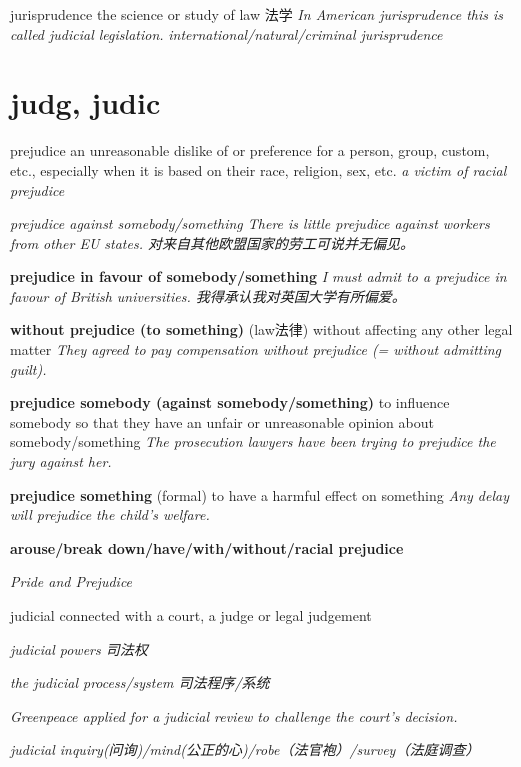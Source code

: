 \begin{DefWord}{jurisprudence}
    the science or study of law 法学
    \textit{In American jurisprudence this is called judicial legislation.}
    \textit{international/natural/criminal jurisprudence}
\end{DefWord}





\section{judg, judic}


\begin{DefWord}{prejudice}
    an unreasonable dislike of or preference for a person, group, custom, etc., especially when it is based on their race, religion, sex, etc.
    \textit{a victim of racial prejudice}

    \textit{prejudice against somebody/something There is little prejudice against workers from other EU states. 对来自其他欧盟国家的劳工可说并无偏见。}
    
    \textbf{prejudice in favour of somebody/something} \textit{I must admit to a prejudice in favour of British universities. 我得承认我对英国大学有所偏爱。}

    \textbf{without prejudice (to something)}
    (law法律) without affecting any other legal matter
    \textit{They agreed to pay compensation without prejudice (= without admitting guilt).}

    \textbf{prejudice somebody (against somebody/something)} to influence somebody so that they have an unfair or unreasonable opinion about somebody/something
    \textit{The prosecution lawyers have been trying to prejudice the jury against her.}

    \textbf{prejudice something} (formal) to have a harmful effect on something
    \textit{Any delay will prejudice the child's welfare.}

    \textbf{arouse/break down/have/with/without/racial prejudice}

    \textit{Pride and Prejudice}

\end{DefWord}

\begin{DefWord}{judicial}
    connected with a court, a judge or legal judgement

    \textit{judicial powers 司法权}

    \textit{the judicial process/system 司法程序/系统}

    \textit{Greenpeace applied for a judicial review to challenge the court's decision.}

    \textit{judicial inquiry(问询)/mind(公正的心)/robe（法官袍）/survey（法庭调查）}
\end{DefWord}

